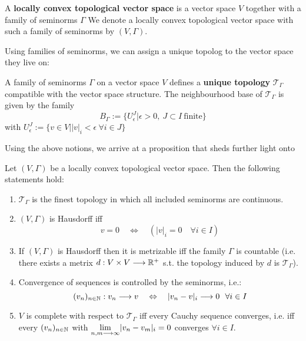 \begin{definition}
\label{def:Locally_convex}
  A \textbf{locally convex topological vector space} is a vector space $V$ together with a family of seminorms $\Gamma$ We denote a locally convex topological vector space with such a family of seminorms by $(V, \Gamma)$.
\end{definition}

Using families of seminorms, we can assign a unique topolog to the vector space they live on:

\begin{definition}
  A family of seminorms $\Gamma$ on a vector space $V$ defines a \textbf{unique topology} $\mathcal{T}_\Gamma$ compatible with the vector space structure. The neighbourhood base of $\mathcal{T}_\Gamma$ is given by the family
  $$ B_\Gamma := \{ U^J_\epsilon | \epsilon > 0, \ J \subset I \ \text{finite} \} $$
  with $U^J_\epsilon := \{ v \in V \big| |v|_i < \epsilon \ \forall i \in J \}$
\end{definition}

Using the above notions, we arrive at a proposition that sheds further light onto

\begin{prop}
  Let $(V,\Gamma)$ be a locally convex topological vector space. Then the following statements hold:
  \begin{enumerate}
    \item $\mathcal{T}_\Gamma$ is the finest topology in which all included seminorms are continuous.

    \item $(V, \Gamma)$ is Hausdorff iff
    $$ v = 0 \quad \Leftrightarrow \quad \left( |v|_i = 0 \quad \forall i \in I\right)$$

    \item If $(V, \Gamma)$ is Hausdorff then it is metrizable iff the family $\Gamma$ is countable (i.e. there exists a metrix $d:V\times V \longrightarrow \mathbb{R}^+$ s.t. the topology induced by $d$ is $\mathcal{T}_\Gamma$).

    \item Convergence of sequences is controlled by the seminorms, i.e.:
    $$ (v_n)_{n\in\mathbb{N}} : v_n \longrightarrow v \quad \Leftrightarrow \quad |v_n - v|_i \longrightarrow 0 \ \ \forall i \in I $$

    \item $V$ is complete with respect to $\mathcal{T}_\Gamma$ iff every Cauchy sequence converges, i.e. iff every $(v_n)_{n\in\mathbb{N}}$ with $\underset{n,m \longrightarrow \infty}{\lim} |v_n - v_m|_i = 0$ converges $\forall i \in I$.
  \end{enumerate}
\end{prop}


